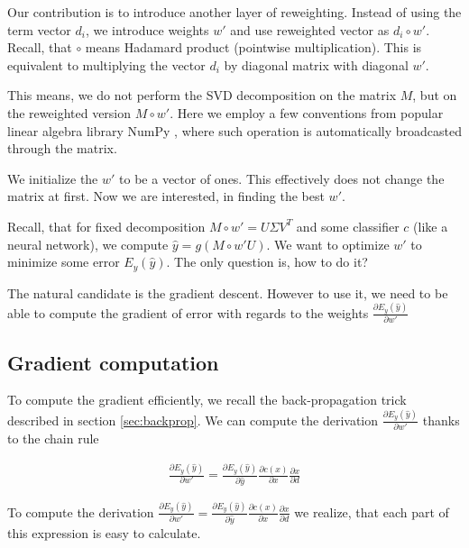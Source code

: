     Our contribution is to introduce another layer of reweighting. 
    Instead of using the term vector $d_i$, we introduce weights $w'$ and use reweighted vector as $d_i \circ w'$.
    Recall, that $\circ$ means Hadamard product (pointwise multiplication).
    This is equivalent to multiplying the vector $d_i$ by diagonal matrix with diagonal $w'$.
    
    This means, we do not perform the SVD decomposition on the matrix $M$, 
    but on the reweighted version $M \circ w'$. 
    Here we employ a few conventions from popular linear algebra library NumPy \cite{oliphant2006guide}, 
    where such operation is automatically broadcasted through the matrix.
    
    We initialize the $w'$ to be a vector of ones. 
    This effectively does not change the matrix at first.
    Now we are interested, in finding the best $w'$. 
    
    Recall, that for fixed decomposition $M\circ w'= U\Sigma V^T$ and some classifier $c$ (like a neural network),
    we compute $\hat{y} = g(M \circ w' U)$.
    We want to optimize $w'$ to minimize some error $E_y(\hat{y})$.
    The only question is, how to do it?
    
    The natural candidate is the gradient descent. 
    However to use it, we need to be able to compute the gradient of error with regards to the weights $\frac{\partial E_y(\hat{y})}{\partial w'}$
    
    \subsection{Gradient computation}
    
    To compute the gradient efficiently, we recall the back-propagation trick described in section \ref{sec:backprop}.
    We can compute the derivation $\frac{\partial E_y(\hat{y})}{\partial w'}$ thanks to the chain rule
    
    \begin{align}
    \frac{\partial E_y(\hat{y})}{\partial w'} = \frac{\partial E_y(\hat{y})}{\partial \hat{y}} \frac{\partial c(x)}{\partial x} \frac{\partial x}{\partial d}
    \end{align}
    
    To compute the derivation $\frac{\partial E_y(\hat{y})}{\partial w'} = \frac{\partial E_y(\hat{y})}{\partial \hat{y}} \frac{\partial c(x)}{\partial x} \frac{\partial x}{\partial d}$ we realize,
    that each part of this expression is easy to calculate.
    
